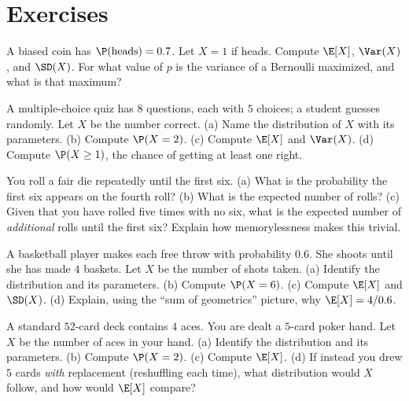 \section{Exercises}
\label{ch07:exercises}

\begin{exercise}
\label{ch07:exr-bern}
A biased coin has $\P(\text{heads}) = 0.7$. Let $X = 1$ if heads. Compute $\E[X]$,
$\Var(X)$, and $\SD(X)$. For what value of $p$ is the variance of a Bernoulli
maximized, and what is that maximum?
\end{exercise}

\begin{exercise}
\label{ch07:exr-binom}
A multiple-choice quiz has $8$ questions, each with $5$ choices; a student guesses
randomly. Let $X$ be the number correct.
(a) Name the distribution of $X$ with its parameters.
(b) Compute $\P(X = 2)$.
(c) Compute $\E[X]$ and $\Var(X)$.
(d) Compute $\P(X \ge 1)$, the chance of getting at least one right.
\end{exercise}

\begin{exercise}
\label{ch07:exr-geom}
You roll a fair die repeatedly until the first six.
(a) What is the probability the first six appears on the fourth roll?
(b) What is the expected number of rolls?
(c) Given that you have rolled five times with no six, what is the expected number
of \emph{additional} rolls until the first six? Explain how memorylessness makes
this trivial.
\end{exercise}

\begin{exercise}
\label{ch07:exr-negbinom}
A basketball player makes each free throw with probability $0.6$. She shoots until
she has made $4$ baskets. Let $X$ be the number of shots taken.
(a) Identify the distribution and its parameters.
(b) Compute $\P(X = 6)$.
(c) Compute $\E[X]$ and $\SD(X)$.
(d) Explain, using the ``sum of geometrics'' picture, why $\E[X] = 4/0.6$.
\end{exercise}

\begin{exercise}[Hypergeometric]
\label{ch07:exr-hypergeom}
A standard $52$-card deck contains $4$ aces. You are dealt a $5$-card poker hand.
Let $X$ be the number of aces in your hand.
(a) Identify the distribution and its parameters.
(b) Compute $\P(X = 2)$.
(c) Compute $\E[X]$.
(d) If instead you drew $5$ cards \emph{with} replacement (reshuffling each time),
what distribution would $X$ follow, and how would $\E[X]$ compare?
\end{exercise}

